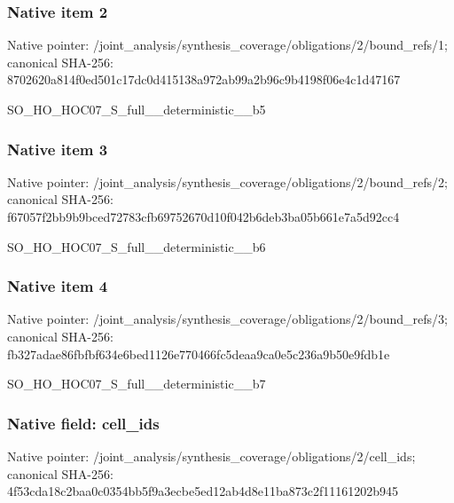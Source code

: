 \documentclass[10pt,a4paper]{article}
\begin{document}
\subsubsection{Native item 2}
Native pointer: /joint\_\allowbreak{}analysis/synthesis\_\allowbreak{}coverage/obligations/2/bound\_\allowbreak{}refs/1; canonical SHA-256: 8702620a814f0ed501c17dc0d415138a972ab99a2b96c9b4198f06e4c1d47167

\begingroup\raggedright\sloppy SO\_\allowbreak{}HO\_\allowbreak{}HOC07\_\allowbreak{}S\_\allowbreak{}full\_\allowbreak{}\_\allowbreak{}deterministic\_\allowbreak{}\_\allowbreak{}b5\par\endgroup

\subsubsection{Native item 3}
Native pointer: /joint\_\allowbreak{}analysis/synthesis\_\allowbreak{}coverage/obligations/2/bound\_\allowbreak{}refs/2; canonical SHA-256: f67057f2bb9b9bced72783cfb69752670d10f042b6deb3ba05b661e7a5d92cc4

\begingroup\raggedright\sloppy SO\_\allowbreak{}HO\_\allowbreak{}HOC07\_\allowbreak{}S\_\allowbreak{}full\_\allowbreak{}\_\allowbreak{}deterministic\_\allowbreak{}\_\allowbreak{}b6\par\endgroup

\subsubsection{Native item 4}
Native pointer: /joint\_\allowbreak{}analysis/synthesis\_\allowbreak{}coverage/obligations/2/bound\_\allowbreak{}refs/3; canonical SHA-256: fb327adae86fbfbf634e6bed1126e770466fc5deaa9ca0e5c236a9b50e9fdb1e

\begingroup\raggedright\sloppy SO\_\allowbreak{}HO\_\allowbreak{}HOC07\_\allowbreak{}S\_\allowbreak{}full\_\allowbreak{}\_\allowbreak{}deterministic\_\allowbreak{}\_\allowbreak{}b7\par\endgroup

\subsubsection{Native field: cell\_\allowbreak{}ids}
Native pointer: /joint\_\allowbreak{}analysis/synthesis\_\allowbreak{}coverage/obligations/2/cell\_\allowbreak{}ids; canonical SHA-256: 4f53cda18c2baa0c0354bb5f9a3ecbe5ed12ab4d8e11ba873c2f11161202b945
\end{document}
